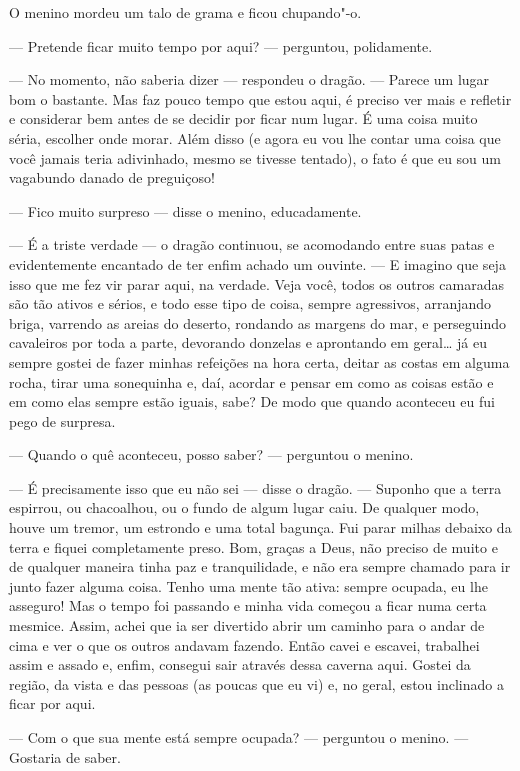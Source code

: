 O menino mordeu um talo de grama e ficou chupando"-o. 

--- Pretende ficar muito tempo por aqui? --- perguntou, polidamente. 

--- No momento, não saberia dizer --- respondeu o dragão. --- Parece um
lugar bom o bastante. Mas faz pouco tempo que estou aqui, é preciso
ver mais e refletir e considerar bem antes de se decidir por ficar
num lugar. É uma coisa muito séria, escolher onde morar. Além disso
(e agora eu vou lhe contar uma coisa que você jamais teria
adivinhado, mesmo se tivesse tentado), o fato é que eu sou um
vagabundo danado de preguiçoso!

--- Fico muito surpreso --- disse o menino, educadamente.

--- É a triste verdade --- o dragão continuou, se acomodando entre suas
patas e evidentemente encantado de ter enfim achado um ouvinte. --- E
imagino que seja isso que me fez vir parar aqui, na verdade. Veja
você, todos os outros camaradas são tão ativos e sérios, e todo esse
tipo de coisa, sempre agressivos, arranjando briga, varrendo as
areias do deserto, rondando as margens do mar, e perseguindo
cavaleiros por toda a parte, devorando donzelas e aprontando em
geral\ldots{} já eu sempre gostei de fazer minhas refeições na hora certa, 
deitar as costas em alguma rocha, tirar uma sonequinha e, daí,
acordar e pensar em como as coisas estão e em como elas sempre estão
iguais, sabe? De modo que quando aconteceu eu fui pego de surpresa.

--- Quando o quê aconteceu, posso saber? --- perguntou o menino.

--- É precisamente isso que eu não sei --- disse o dragão. --- Suponho que a
terra espirrou, ou chacoalhou, ou o fundo de algum lugar caiu. De
qualquer modo, houve um tremor, um estrondo e uma total bagunça.
Fui parar milhas debaixo da terra e fiquei completamente preso.
Bom, graças a Deus, não preciso de muito e de qualquer maneira tinha
paz e tranquilidade, e não era sempre chamado para ir junto fazer
alguma coisa. Tenho uma mente tão ativa: sempre ocupada, eu lhe
asseguro! Mas o tempo foi passando e minha vida começou a ficar numa
certa mesmice. Assim, achei que ia ser divertido abrir um caminho
para o andar de cima e ver o que os outros andavam fazendo. Então 
cavei e escavei, trabalhei assim e assado e, enfim, consegui sair
através dessa caverna aqui. Gostei da região, da vista e das
pessoas (as poucas que eu vi) e, no geral, estou inclinado a ficar por
aqui.

--- Com o que sua mente está sempre ocupada? --- perguntou o menino. ---
Gostaria de saber. 

